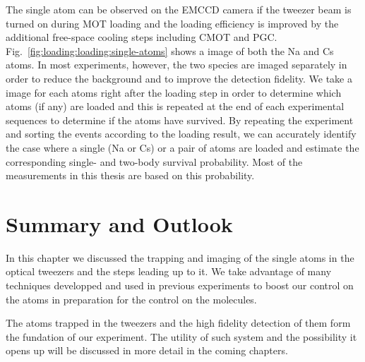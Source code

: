 The single atom can be observed on the EMCCD camera if the tweezer beam
is turned on during MOT loading and the loading efficiency is improved
by the additional free-space cooling steps including CMOT and PGC.
Fig.~\ref{fig:loading:loading:single-atoms} shows a image of both the Na and Cs atoms.
In most experiments, however, the two species are imaged separately
in order to reduce the background and to improve the detection fidelity.
We take a image for each atoms right after the loading step in order to determine
which atoms (if any) are loaded and this is repeated at the end of each experimental sequences
to determine if the atoms have survived.
By repeating the experiment and sorting the events according to the loading result,
we can accurately identify the case where a single (Na or Cs) or a pair of atoms are loaded
and estimate the corresponding single- and two-body survival probability.
Most of the measurements in this thesis are based on this probability.

\section{Summary and Outlook}
\label{ch:loading:summary}

In this chapter we discussed the trapping and imaging of the single atoms in the optical
tweezers and the steps leading up to it.
We take advantage of many techniques developped and used in previous experiments
to boost our control on the atoms in preparation for the control on the molecules.

The atoms trapped in the tweezers and the high fidelity detection of them
form the fundation of our experiment.
The utility of such system and the possibility it opens up will be discussed
in more detail in the coming chapters.
